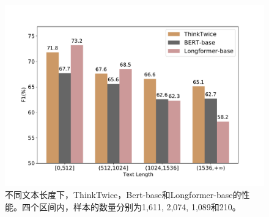 \begin{figure}[htbp]
    \centering
    \includegraphics[scale=0.5]{figure/3-3.pdf}
    \caption{不同文本长度下，ThinkTwice，Bert-base和Longformer-base的性能。四个区间内，样本的数量分别为1,611, 2,074, 1,089和210。}
    \label{fig:3-3}
\end{figure}
